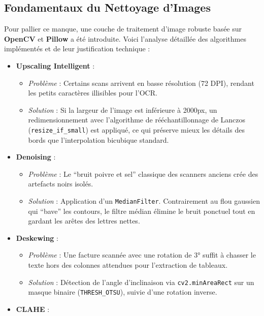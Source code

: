 \documentclass[
  letterpaper,
  DIV=11,
  numbers=noendperiod]{scrartcl}
\providecommand{\tightlist}{%
  \setlength{\itemsep}{0pt}\setlength{\parskip}{0pt}}
\begin{document}
\subsection{Fondamentaux du Nettoyage
d'Images}\label{fondamentaux-du-nettoyage-dimages}

Pour pallier ce manque, une couche de traitement d'image robuste basée
sur \textbf{OpenCV} et \textbf{Pillow} a été introduite. Voici l'analyse
détaillée des algorithmes implémentés et de leur justification technique
:

\begin{itemize}
\tightlist
\item
  \textbf{Upscaling Intelligent} :

  \begin{itemize}
  \tightlist
  \item
    \emph{Problème} : Certains scans arrivent en basse résolution (72
    DPI), rendant les petits caractères illisibles pour l'OCR.
  \item
    \emph{Solution} : Si la largeur de l'image est inférieure à 2000px,
    un redimensionnement avec l'algorithme de rééchantillonnage de
    Lanczos (\texttt{resize\_if\_small}) est appliqué, ce qui préserve
    mieux les détails des bords que l'interpolation bicubique standard.
  \end{itemize}
\item
  \textbf{Denoising} :

  \begin{itemize}
  \tightlist
  \item
    \emph{Problème} : Le ``bruit poivre et sel'' classique des scanners
    anciens crée des artefacts noirs isolés.
  \item
    \emph{Solution} : Application d'un \texttt{MedianFilter}.
    Contrairement au flou gaussien qui ``bave'' les contours, le filtre
    médian élimine le bruit ponctuel tout en gardant les arêtes des
    lettres nettes.
  \end{itemize}
\item
  \textbf{Deskewing} :

  \begin{itemize}
  \tightlist
  \item
    \emph{Problème} : Une facture scannée avec une rotation de 3° suffit
    à chasser le texte hors des colonnes attendues pour l'extraction de
    tableaux.
  \item
    \emph{Solution} : Détection de l'angle d'inclinaison via
    \texttt{cv2.minAreaRect} sur un masque binaire
    (\texttt{THRESH\_OTSU}), suivie d'une rotation inverse.
  \end{itemize}
\item
  \textbf{CLAHE} :


\end{itemize}
\end{document}
